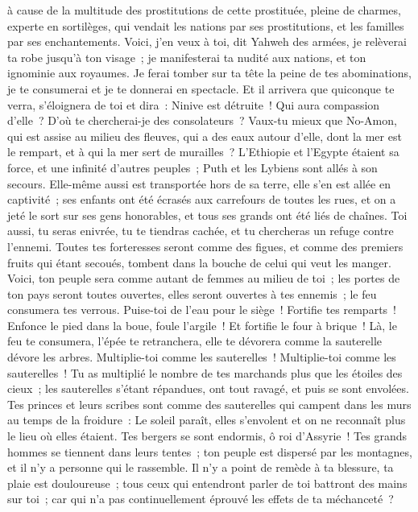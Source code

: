 \begin{multicols}{2}
à cause de la multitude des prostitutions de cette prostituée, pleine de charmes, experte en sortilèges, qui vendait les nations par ses prostitutions, et les familles par ses enchantements.
Voici, j'en veux à toi, dit Yahweh des armées, je relèverai ta robe jusqu'à ton visage~; je manifesterai ta nudité aux nations, et ton ignominie aux royaumes.
Je ferai tomber sur ta tête la peine de tes abominations, je te consumerai et je te donnerai en spectacle.
Et il arrivera que quiconque te verra, s'éloignera de toi et dira~: Ninive est détruite~! Qui aura compassion d'elle~? D'où te chercherai-je des consolateurs~?
Vaux-tu mieux que No-Amon, qui est assise au milieu des fleuves, qui a des eaux autour d'elle, dont la mer est le rempart, et à qui la mer sert de murailles~?
L'Ethiopie et l'Egypte étaient sa force, et une infinité d'autres peuples~; Puth et les Lybiens sont allés à son secours.
Elle-même aussi est transportée hors de sa terre, elle s'en est allée en captivité~; ses enfants ont été écrasés aux carrefours de toutes les rues, et on a jeté le sort sur ses gens honorables, et tous ses grands ont été liés de chaînes.
Toi aussi, tu seras enivrée, tu te tiendras cachée, et tu chercheras un refuge contre l'ennemi.
Toutes tes forteresses seront comme des figues, et comme des premiers fruits qui étant secoués, tombent dans la bouche de celui qui veut les manger.
Voici, ton peuple sera comme autant de femmes au milieu de toi~; les portes de ton pays seront toutes ouvertes, elles seront ouvertes à tes ennemis~; le feu consumera tes verrous.
Puise-toi de l'eau pour le siège~! Fortifie tes remparts~! Enfonce le pied dans la boue, foule l'argile~! Et fortifie le four à brique~!
Là, le feu te consumera, l'épée te retranchera, elle te dévorera comme la sauterelle dévore les arbres. Multiplie-toi comme les sauterelles~! Multiplie-toi comme les sauterelles~!
Tu as multiplié le nombre de tes marchands plus que les étoiles des cieux~; les sauterelles s'étant répandues, ont tout ravagé, et puis se sont envolées.
Tes princes et leurs scribes sont comme des sauterelles qui campent dans les murs au temps de la froidure~: Le soleil paraît, elles s'envolent et on ne reconnaît plus le lieu où elles étaient.
Tes bergers se sont endormis, ô roi d'Assyrie~! Tes grands hommes se tiennent dans leurs tentes~; ton peuple est dispersé par les montagnes, et il n'y a personne qui le rassemble.
Il n'y a point de remède à ta blessure, ta plaie est douloureuse~; tous ceux qui entendront parler de toi battront des mains sur toi~; car qui n'a pas continuellement éprouvé les effets de ta méchanceté~?
\PPE{}
\end{multicols}
